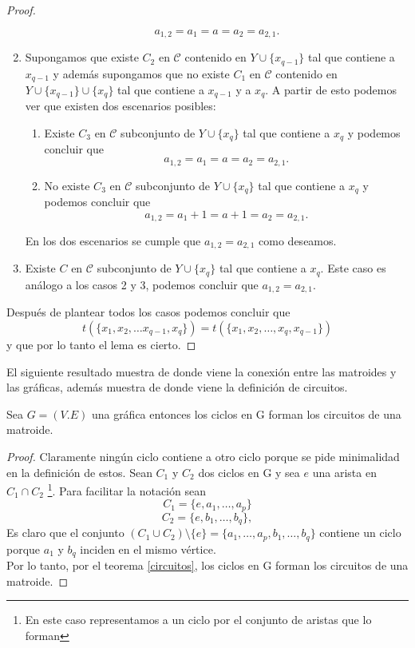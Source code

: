 \begin{proof}
\begin{enumerate}
$$a_{1,2}=a_1 =a=a_2 = a_{2,1}.$$
\item Supongamos que existe $C_2$ en $\mathcal{C}$ contenido en $Y \cup \{ x_{q-1}\}$ tal que contiene a $x_{q-1}$ y además supongamos que no existe $C_1$ en $\mathcal{C}$ contenido en $Y \cup \{ x_{q-1}\} \cup \{x_q\}$ tal que contiene a $x_{q-1}$ y a $x_q$. A partir de esto podemos ver que existen dos escenarios posibles: 
\begin{enumerate}
\item Existe $C_3$ en $\mathcal{C}$ subconjunto de $Y \cup \{ x_{q}\}$ tal que contiene a $x_{q}$ y podemos concluir que 
$$a_{1,2}=a_1 =a=a_2 = a_{2,1}.$$
\item No existe $C_3$ en $\mathcal{C}$ subconjunto de $Y \cup \{ x_{q}\}$ tal que contiene a $x_{q}$ y podemos concluir que 
$$a_{1,2}=a_1 +1 = a + 1= a_2 = a_{2,1}.$$
\end{enumerate}
En los dos escenarios se cumple que $a_{1,2}=a_{2,1}$ como deseamos. 
\item Existe $C$ en $\mathcal{C}$ subconjunto de $Y \cup \{x_q\}$ tal que contiene a $x_q$. Este caso es análogo a los casos 2 y 3, podemos concluir que $a_{1,2}=a_{2,1}$. 
\end{enumerate}
Después de plantear todos los casos podemos concluir que $$t(\{x_1,x_2,\dots x_{q-1},x_q\}) = t(\{x_1,x_2,\dots,x_q,x_{q-1}\}) $$ y que por lo tanto el lema es cierto.
\end{proof}


El siguiente resultado muestra de donde viene la conexión entre las matroides y las gráficas, además muestra de donde viene la definición de circuitos.

\begin{teo}
Sea $G=(V.E)$ una gráfica entonces los ciclos en G forman los circuitos de una matroide. 
\end{teo}
\begin{proof}
Claramente ningún ciclo contiene a otro ciclo porque se pide minimalidad en la definición de estos. Sean $C_1$ y $C_2$ dos ciclos en G y sea $e$ una arista en $C_1 \cap C_2$ \footnote{En este caso representamos a un ciclo por el conjunto de aristas que lo forman}. Para facilitar la notación sean 
$$C_1 = \{ e, a_1, \dots, a_p\} $$
$$C_2 = \{e,b_1,\dots, b_q \},$$
Es claro que el conjunto $(C_1 \cup C_2) \setminus \{e\}= \{ a_1, \dots, a_p, b_1,\dots, b_q\}$ contiene un ciclo porque $a_1$ y $b_q$ inciden en el mismo vértice. \\
Por lo tanto, por el teorema \ref{circuitos}, los ciclos en G forman los circuitos de una matroide.
\end{proof}

